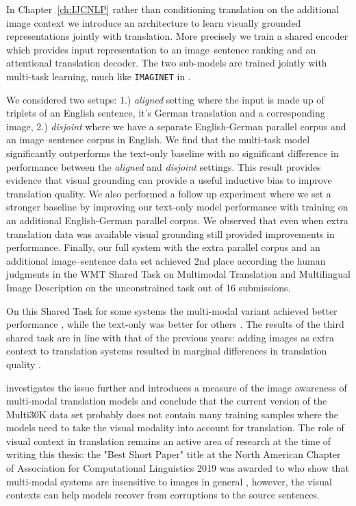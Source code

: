 In Chapter~\ref{ch:IJCNLP} rather than conditioning translation on the additional image context we 
introduce an architecture to learn visually grounded representations jointly with translation.
More precisely we train a shared
encoder which provides input representation to an image--sentence ranking and an
attentional translation decoder. The two sub-models are trained jointly with multi-task learning, much
like \texttt{IMAGINET} in \cite{chrupala2015learning}.

We considered two setups:
1.) \emph{aligned} setting where the input is made up of triplets of an English sentence, 
it's German translation and a corresponding image, 2.) \emph{disjoint} where we have a
separate English-German parallel corpus and an image--sentence corpus in English.
We find that the multi-task model significantly outperforms the text-only baseline with
no significant difference in performance between the \emph{aligned} and \emph{disjoint}
settings. This result provides evidence that visual grounding can provide a useful inductive bias to 
improve translation quality. 
We also performed a follow up experiment where we set a stronger baseline by 
improving our text-only model performance with 
training on an additional English-German parallel corpus. We observed that even when
extra translation data was available visual grounding still provided improvements in performance.
Finally, our full system with the extra parallel corpus and an additional image--sentence data set achieved
2nd place according the human judgments in the WMT Shared Task on Multimodal Translation 
and Multilingual Image Description \citep{elliott2017findings} 
on the unconstrained task out of 16 submissions. 

On this Shared Task for some
systems the multi-modal variant achieved better performance
\citep{caglayan2017lium}, while the text-only was better for others \citep{ma2017osu}. 
The results of the third shared task are in line with that of the previous years:
adding images as extra context to translation systems resulted in marginal 
differences in translation quality \citep{barrault2018findings}.

\cite{elliott2018adversarial} investigates the issue further and introduces
a measure of the image awareness of multi-modal translation models and conclude that the current 
version of the Multi30K data set probably does not contain many training samples where the models 
need to take the visual modality into account for translation. The role of visual context in translation
remains an active area of research at the time of writing this thesis: the "Best Short Paper" title
at the North American Chapter of Association for Computational Linguistics 2019 was awarded to
\citep{caglayan2019probing} who show that multi-modal systems are insensitive to images in general
, however, the visual contexts can help models recover from corruptions to the source sentences.



